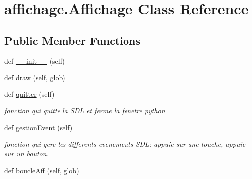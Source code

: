 \hypertarget{classaffichage_1_1_affichage}{}\section{affichage.\+Affichage Class Reference}
\label{classaffichage_1_1_affichage}
\subsection*{Public Member Functions}
\begin{DoxyCompactItemize}
\item 
def \hyperlink{classaffichage_1_1_affichage_af97834b8341cdefdf301ece9163f1ee7}{\+\_\+\+\_\+init\+\_\+\+\_\+} (self)
\item 
def \hyperlink{classaffichage_1_1_affichage_a647ba807e5b1382a57620a50260ffd3e}{draw} (self, glob)
\item 
def \hyperlink{classaffichage_1_1_affichage_a72099522a0eabcb0be314bc912a2004e}{quitter} (self)
\begin{DoxyCompactList}\small\item\em fonction qui quitte la S\+DL et ferme la fenetre python \end{DoxyCompactList}\item 
def \hyperlink{classaffichage_1_1_affichage_a3ad2f7f2c22a2ff4863af09fd1b3ecd3}{gestion\+Event} (self)
\begin{DoxyCompactList}\small\item\em fonction qui gere les differents evenements S\+DL\+: appuie sur une touche, appuie sur un bouton. \end{DoxyCompactList}\item 
def \hyperlink{classaffichage_1_1_affichage_a33fa9c0044828bb8e177f36ac7927921}{boucle\+Aff} (self, glob)
\end{DoxyCompactItemize}

